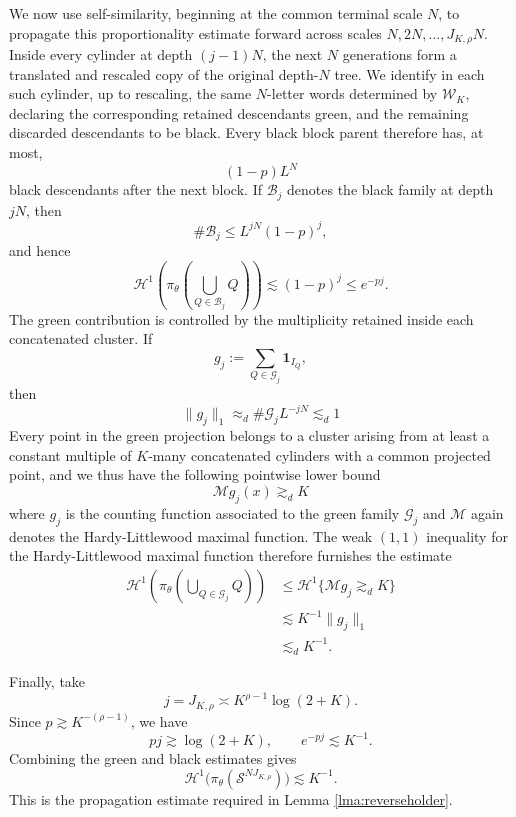 \documentclass[12pt]{amsart}
\numberwithin{equation}{section}
\newcommand{\cM}{\mathcal{M}}
\begin{document}
\begin{enumerate}[leftmargin=*,labelindent=0pt]
    We now use self-similarity, beginning at the common terminal scale $N$, to propagate this proportionality estimate forward across scales $N, 2N,..., J_{K,\rho}N$.  Inside every cylinder at depth $(j-1)N$, the next $N$ generations form a translated and rescaled copy of the original depth-$N$ tree.  We identify in each such cylinder, up to rescaling, the same $N$-letter words determined by
    $\mathscr W_K$, declaring the corresponding retained descendants green,
    and the remaining discarded  descendants to be black.  Every black block parent therefore has, at most,
    \[
        (1-p)L^N
    \]
    black descendants after the next block.  If $\mathscr B_j$ denotes the
    black family at depth $jN$, then
    \[
        \#\mathscr B_j\leq L^{jN}(1-p)^j,
    \]
    and hence
    \[
        \mathcal H^1\left(
        \pi_\theta\left(\bigcup_{Q\in\mathscr B_j}Q\right)
        \right)
        \lesssim(1-p)^j
        \leq e^{-pj}.
    \]
    The green contribution is controlled by the multiplicity retained inside each concatenated cluster.  If
    \[
        g_j:=\sum_{Q\in\mathscr G_j}\mathbf 1_{I_Q},
    \]
    then
    \[
        \|g_j\|_1
        \approx_d \#\mathscr G_j L^{-jN}
        \lesssim_d 1
    \]
    Every point in the green projection belongs to a cluster arising from at least a constant multiple of $K$-many concatenated cylinders with a common projected point, and we thus have the following pointwise lower bound
    \[
        \cM g_j(x)\gtrsim_d K
    \]
    where $g_j$ is the counting function associated to the green family $\mathscr{G}_j$ and $\cM$ again denotes the Hardy-Littlewood maximal function.  The weak $(1,1)$ inequality for the Hardy-Littlewood maximal function therefore furnishes the estimate
    \[
    \begin{aligned}
        \mathcal H^1\left(
        \pi_\theta\left(\bigcup_{Q\in\mathscr G_j}Q\right)
        \right)
        &\leq
        \mathcal H^1\{\cM g_j\gtrsim_d K\}\\[1ex]
        &\lesssim K^{-1}\|g_j\|_1\\[1ex]
        &\lesssim_d K^{-1}.
    \end{aligned}
    \]

    Finally, take
    \[
        j=J_{K,\rho}
        \asymp K^{\rho-1}\log(2+K).
    \]
    Since $p\gtrsim K^{-(\rho-1)}$, we have
    \[
        pj\gtrsim\log(2+K),
        \qquad
        e^{-pj}\lesssim K^{-1}.
    \]
    Combining the green and black estimates gives
    \[
        \mathcal H^1\bigl(
        \pi_\theta(\mathcal S^{NJ_{K,\rho}})
        \bigr)\lesssim K^{-1}.
    \]
    This is the propagation estimate required in Lemma
    \ref{lma:reverseholder}.
\end{enumerate}
\end{document}
